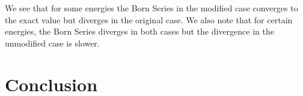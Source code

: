 \documentclass[a4paper,10pt]{report}
\begin{document}
We see that for some energies the Born Series in the modified case converges to the exact value but diverges in the original case. We also note that
for certain energies, the Born Series diverges in both cases but the divergence in the unmodified case is slower.

\section{Conclusion}



\end{document}
